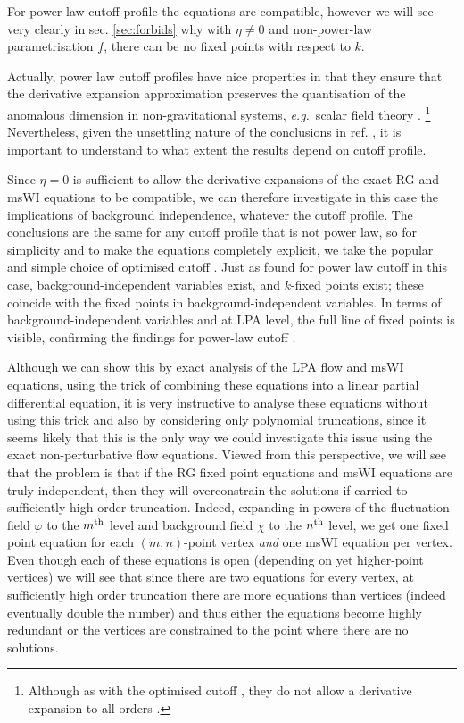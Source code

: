\documentclass[11pt,draft]{book} %
\newcommand\eg{\textit{e.g.}\ }
\newcommand{\vp}{\varphi}
\begin{document}
For power-law cutoff profile the equations are compatible, however we will see very
clearly in sec. \ref{sec:forbids} why with $\eta\ne0$ and non-power-law parametrisation $f$,
there can be no fixed points with respect to $k$.

Actually, power law cutoff profiles have nice properties in  that they ensure that the derivative
expansion approximation preserves the quantisation of the anomalous dimension in non-gravitational systems,
\eg scalar field theory \cite{Morris:1994ie, Morris:1994jc, Morris:1998da}.%
\footnote{Although as with the optimised cutoff \cite{Litim:2000ci, Litim:2001fd},
they do not allow a derivative expansion to all orders \cite{Morris:2005ck, Morris:1999ba, Morris:2000hm}.}
Nevertheless, given the unsettling nature of the conclusions in ref.
\cite{Dietz:2015owa}, it is important to understand  to what extent the results depend on cutoff profile.

Since $\eta=0$ is sufficient to allow the derivative expansions of the exact RG and msWI equations
to be compatible, we can therefore investigate in this case the implications of background independence,
whatever the cutoff profile. The conclusions are the same for any cutoff profile that is not power law,
so for simplicity and to make the equations completely explicit,
we take the popular and simple choice of optimised cutoff \cite{Litim:2000ci, Litim:2001fd}.
Just as found for power law cutoff \cite{Dietz:2016gzg} in this case, background-independent variables exist,
and $k$-fixed points exist; these coincide with the fixed points in background-independent variables.
In terms of background-independent variables and at LPA level, the full line of fixed points
is visible, confirming the findings for power-law cutoff \cite{Dietz:2016gzg}.

Although we can show this by exact analysis of the LPA flow and msWI equations,
using the trick of combining these equations into a linear partial differential equation,
it is very instructive to analyse these equations without using this trick and also by considering
only polynomial truncations, since it seems likely that this is the only way we could investigate this
issue using the exact non-perturbative flow equations. Viewed from this perspective,
we will see that the problem is that if the RG fixed point equations and msWI equations are truly independent,
then they will overconstrain the solutions if carried to sufficiently high order truncation.
Indeed, expanding in powers of the fluctuation field $\vp$ to the $m^{\rm th}$ level and
background field $\chi$ to the $n^{\rm th}$ level, we get one fixed point equation for
each $(m,n)$-point vertex \emph{and} one msWI equation per vertex.
Even though each of these equations is open (depending on yet higher-point vertices) we will
see that since there are two equations for every vertex, at sufficiently high order truncation there
are more equations than vertices (indeed eventually double the number) and thus either the equations
become highly redundant or the vertices are constrained to the point where there are no solutions.
\end{document}

